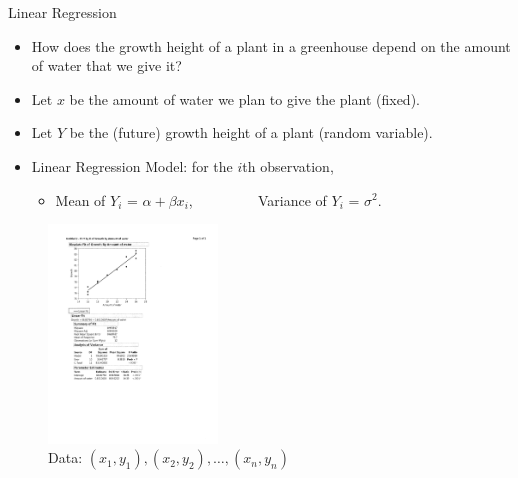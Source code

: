 \documentclass[10pt, handout, xcolor=table]{beamer}
\newcommand*\themecol{\usebeamercolor[fg]{structure}}
\begin{document}
\begin{frame}{Linear Regression}
\begin{itemize}
\setlength{\itemsep}{8pt}
\item How does the growth height of a plant in a greenhouse depend on the amount of water that we give it?
\item Let $x$ be the amount of water we plan to give the plant (fixed).
\item Let $Y$ be the (future) growth height of a plant (random variable).
\item {\themecol Linear Regression Model}: for the $i$th observation,
\vspace{0.25cm}

\begin{itemize}
\setlength{\itemsep}{8pt}
\item Mean of $Y_i$ = $\alpha + \beta x_i$, $\qquad\qquad$ Variance of $Y_i$ = $\sigma^2$.
\end{itemize}
\end{itemize}
\begin{figure}
\includegraphics[width = 0.4\textwidth]{images/rec9_1}
\caption{Data: $(x_1, y_1), (x_2, y_2), \dots, (x_n, y_n)$}
\end{figure}
\end{frame}
\end{document}
